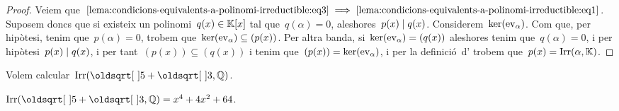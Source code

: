 \documentclass[../teoria-de-Galois.tex]{subfiles}
\begin{document}
\begin{proof}
        Veiem que~\(\eqref{lema:condicions-equivalents-a-polinomi-irreductible:eq3}\implies\eqref{lema:condicions-equivalents-a-polinomi-irreductible:eq1}\).
        Suposem doncs que si existeix un polinomi~\(q(x)\in\mathbb{K}[x]\) tal que~\(q(\alpha)=0\), aleshores~\(p(x)\mathrel{|} q(x)\).
        Considerem~\(\operatorname{ker}(\mathrm{ev}_{\alpha})\).
        Com que, per hipòtesi, tenim que~\(p(\alpha)=0\), trobem que~\(\operatorname{ker}(\mathrm{ev}_{\alpha})\subseteq(p(x))\).
        Per altra banda, si~\(\operatorname{ker}(\mathrm{ev}_{\alpha})=(q(x))\) aleshores tenim que~\(q(\alpha)=0\), i per hipòtesi~\(p(x)\mathrel{|} q(x)\), i per tant~\((p(x))\subseteq(q(x))\) i tenim que~\((p(x))=\operatorname{ker}(\mathrm{ev}_{\alpha})\), i per la definició~d' trobem que~\(p(x)=\operatorname{Irr}(\alpha,\mathbb{K})\).
    \end{proof}
    \begin{example}
        Volem calcular~\(\Irr(\sqrt{5}+\sqrt{3},\QQ)\).
    \end{example}
    \begin{solution}
        \(\Irr(\sqrt{5}+\sqrt{3},\QQ)=x^{4}+4x^{2}+64\).
    \end{solution}
\end{document}
